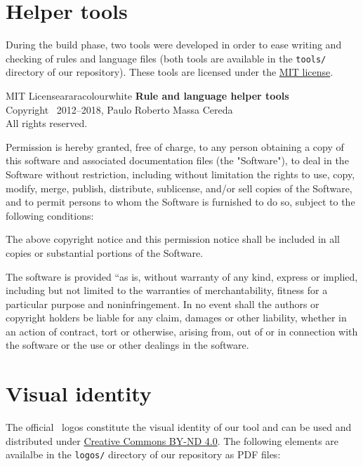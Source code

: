 \documentclass[a4paper,twoside,12pt]{memoir}
\begin{document}
\section*{Helper tools}

During the build phase, two tools were developed in order
to ease writing and checking of rules and language files
(both tools are available in the \verb|tools/| directory
of our repository). These tools are licensed under the
\href{https://opensource.org/licenses/MIT}{MIT license}.

\vspace{1em}

\begin{messagebox}{MIT License}{araracolour}{\icinfo}{white}
\setlength{\parskip}{1em}
\textbf{Rule and language helper tools}\\
Copyright \textcopyright\ 2012--2018, Paulo Roberto
Massa Cereda\\
All rights reserved.

Permission is hereby granted, free of charge, to any
person obtaining a copy of this software and associated
documentation files (the "Software"), to deal in the
Software without restriction, including without limitation
the rights to use, copy, modify, merge, publish, distribute,
sublicense, and/or sell copies of the Software, and to
permit persons to whom the Software is furnished to do so,
subject to the following conditions:

The above copyright notice and this permission notice shall
be included in all copies or substantial portions of the
Software.

The software is provided ``as is, without warranty of any
kind, express or implied, including but not limited to the
warranties of merchantability, fitness for a particular
purpose and noninfringement. In no event shall the authors
or copyright holders be liable for any claim, damages or
other liability, whether in an action of contract, tort or
otherwise, arising from, out of or in connection with the
software or the use or other dealings in the software.
\end{messagebox}

\section*{Visual identity}

The official \arara\ logos constitute the visual identity
of our tool and can be used and distributed under
\href{https://creativecommons.org/licenses/by-nd/4.0/}{Creative
Commons BY-ND 4.0}. The following elements are availalbe in
the \verb|logos/| directory of our repository as PDF files:
\end{document}
